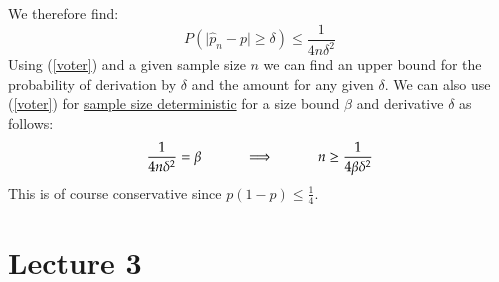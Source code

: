 \documentclass[14pt,twoside,a4paper,fleqn]{article}
\theoremstyle{plain}
\begin{document}
	
	
	
We therefore find:
	\begin{equation}\label{voter}
	P(\vert\hat{p}_n - p\vert \geq \delta) \leq \frac{1}{4n\delta^2}
	\end{equation}
Using (\ref{voter}) and a given sample size $n$ we can find an upper bound for the probability of derivation by $\delta$ and the amount for any given $\delta$.\newline
We can also use (\ref{voter}) for \underline{sample size deterministic} for a size bound $
\beta$ and derivative $\delta$ as follows:
$$\frac{1}{4n\delta^2}= \beta\hspace*{1cm} \implies \hspace*{1cm} n \geq \frac{1}{4\beta\delta^2}$$
This is of course conservative since $p(1-p)\leq \frac{1}{4}$.



\newpage
\section{Lecture 3}
\end{document}
